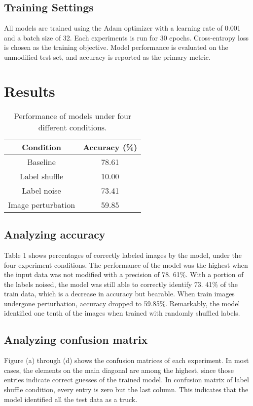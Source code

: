 \documentclass[10pt,twocolumn,letterpaper]{article}
\begin{document}
\subsection{Training Settings}
All models are trained using the Adam optimizer with a learning rate of 0.001 and a batch size of 32. Each experiments is run for 30 epochs. Cross-entropy loss is chosen as the training objective. Model performance is evaluated on the unmodified test set, and accuracy is reported as the primary metric.

\section{Results}

\begin{table}[h]
    \centering
    \begin{tabular}{|c|c|}
        \hline
        Condition & Accuracy (\%) \\
        \hline
        Baseline & 78.61 \\
        \hline
        Label shuffle & 10.00 \\
        \hline
        Label noise & 73.41 \\
        \hline
        Image perturbation & 59.85 \\
        \hline
    \end{tabular}
    \caption{Performance of models under four different conditions.}
    \label{tab:performance}
\end{table}

\subsection{Analyzing accuracy}
Table 1 shows percentages of correctly labeled images by the model, under the four experiment conditions. The performance of the model was the highest when the input data was not modified with a precision of 78. 61\%. With a portion of the labels noised, the model was still able to correctly identify 73. 41\% of the train data, which is a decrease in accuracy but bearable. When train images undergone perturbation, accuracy dropped to 59.85\%. Remarkably, the model identified one tenth of the images when trained with randomly shuffled labels.

\subsection{Analyzing confusion matrix}
Figure (a) through (d) shows the confusion matrices of each experiment. In most cases, the elements on the main diagonal are among the highest, since those entries indicate correct guesses of the trained model. In confusion matrix of label shuffle condition, every entry is zero but the last column. This indicates that the model identified all the test data as a truck.
\end{document}
